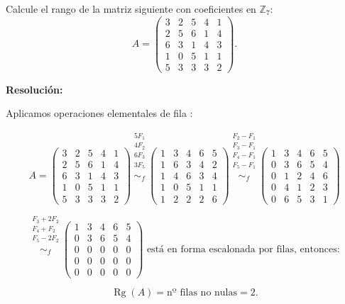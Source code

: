 \documentclass[a4paper,12pt]{article}
\begin{document}
\begin{ejercicio}[title=Ejercicio 9]
Calcule el rango de la matriz siguiente con coeficientes en $\mathbb{Z}_7$:
\[
A =
\begin{pmatrix}
3 & 2 & 5 & 4 & 1\\
2 & 5 & 6 & 1 & 4\\
6 & 3 & 1 & 4 & 3\\
1 & 0 & 5 & 1 & 1\\
5 & 3 & 3 & 3 & 2
\end{pmatrix}.
\]

\tcblower
\textbf{Resolución:}

Aplicamos operaciones elementales de fila :

\[
A =
\begin{pmatrix}
3 & 2 & 5 & 4 & 1\\
2 & 5 & 6 & 1 & 4\\
6 & 3 & 1 & 4 & 3\\
1 & 0 & 5 & 1 & 1\\
5 & 3 & 3 & 3 & 2
\end{pmatrix}
\overset{\substack{5F_1\\4F_2\\6F_3\\3F_5\\{}}}{\sim_f}
\begin{pmatrix}
1 & 3 & 4 & 6 & 5\\
1 & 6 & 3 & 4 & 2\\
1 & 4 & 6 & 3 & 4\\
1 & 0 & 5 & 1 & 1\\
1 & 2 & 2 & 2 & 6
\end{pmatrix}
\overset{\substack{F_2 - F_1\\F_3 - F_1\\F_4 - F_1\\F_5 - F_1\\{}}}{\sim_f}
\begin{pmatrix}
1 & 3 & 4 & 6 & 5\\
0 & 3 & 6 & 5 & 4\\
0 & 1 & 2 & 4 & 6\\
0 & 4 & 1 & 2 & 3\\
0 & 6 & 5 & 3 & 1
\end{pmatrix}
\]

\[
\overset{\substack{F_3 + 2F_2\\F_4 + F_2\\F_5 - 2F_2\\{}}}{\sim_f}
\begin{pmatrix}
1 & 3 & 4 & 6 & 5\\
0 & 3 & 6 & 5 & 4\\
0 & 0 & 0 & 0 & 0\\
0 & 0 & 0 & 0 & 0\\
0 & 0 & 0 & 0 & 0
\end{pmatrix}
\text{ está en forma escalonada por filas, entonces:}
\]

\[
\operatorname{Rg}(A) = \text{nº filas no nulas} = \boxed{2}.
\]

\end{ejercicio}
\end{document}
